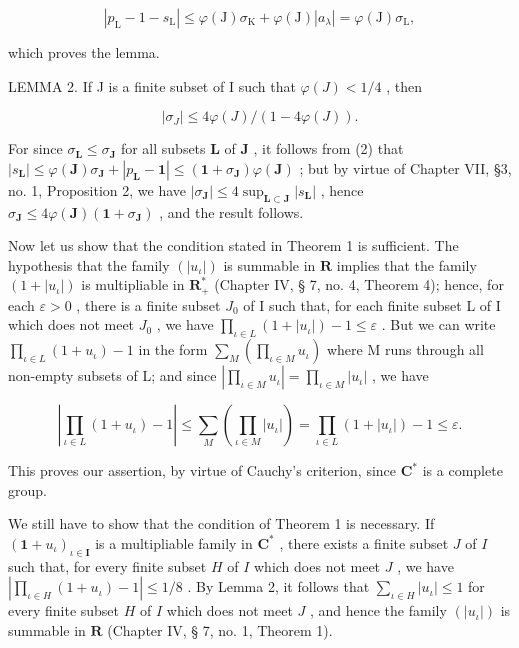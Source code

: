 \[
\left| p _ {\mathrm{L}} - \mathrm{1} - s _ {\mathrm{L}} \right| \leqslant \varphi (\mathrm{J}) \sigma_ {\mathrm{K}} + \varphi (\mathrm{J}) \left| a _ {\lambda} \right| = \varphi (\mathrm{J}) \sigma_ {\mathrm{L}},
\]

which proves the lemma.

LEMMA 2. If J is a finite subset of I such that \(\varphi(J) < 1/4\) , then

\[
\left| \sigma_ {J} \right| \leqslant 4 \varphi (J) / (1 - 4 \varphi (J)).
\]

For since \(\sigma_{\mathbf{L}} \leqslant \sigma_{\mathbf{J}}\) for all subsets \(\mathbf{L}\) of \(\mathbf{J}\) , it follows from (2) that \(|s_{\mathbf{L}}| \leqslant \varphi(\mathbf{J})\sigma_{\mathbf{J}} + |p_{\mathbf{L}} - \mathbf{1}| \leqslant (\mathbf{1} + \sigma_{\mathbf{J}})\varphi(\mathbf{J})\) ; but by virtue of Chapter VII, §3, no. 1, Proposition 2, we have \(|\sigma_{\mathbf{J}}| \leqslant 4\sup_{\mathbf{L} \subset \mathbf{J}} |s_{\mathbf{L}}|\) , hence \(\sigma_{\mathbf{J}} \leqslant 4\varphi(\mathbf{J})(\mathbf{1} + \sigma_{\mathbf{J}})\) , and the result follows.

Now let us show that the condition stated in Theorem 1 is sufficient. The hypothesis that the family \((|u_{\iota}|)\) is summable in \(\mathbf{R}\) implies that the family \((\mathrm{1} + |u_{\iota}|)\) is multipliable in \(\mathbf{R}_{+}^{*}\) (Chapter IV, § 7, no. 4, Theorem 4); hence, for each \(\varepsilon > 0\) , there is a finite subset \(J_{0}\) of I such that, for each finite subset L of I which does not meet \(J_{0}\) , we have \(\prod_{\iota \in L} (\mathrm{1} + |u_{\iota}|) - \mathrm{1} \leqslant \varepsilon\) . But we can write \(\prod_{\iota \in L} (\mathrm{1} + u_{\iota}) - \mathrm{1}\) in the form \(\sum_{M} \left( \prod_{\iota \in M} u_{\iota} \right)\) where M runs through all non-empty subsets of L; and since \(\left| \prod_{\iota \in M} u_{\iota} \right| = \prod_{\iota \in M} |u_{\iota}|\) , we have

\[
\left| \prod_ {\iota \in L} (1 + u _ {\iota}) - 1 \right| \leqslant \sum_ {M} \left(\prod_ {\iota \in M} | u _ {\iota} |\right) = \prod_ {\iota \in L} (1 + | u _ {\iota} |) - 1 \leqslant \varepsilon .
\]

This proves our assertion, by virtue of Cauchy's criterion, since \(\mathbf{C}^*\) is a complete group.

We still have to show that the condition of Theorem 1 is necessary. If \((\mathbf{1} + u_{\iota})_{\iota\in \mathbf{I}}\) is a multipliable family in \(\mathbf{C}^*\) , there exists a finite subset \(J\) of \(I\) such that, for every finite subset \(H\) of \(I\) which does not meet \(J\) , we have \(\left|\prod_{\iota\in H}(1 + u_{\iota}) - 1\right| \leqslant 1/8\) . By Lemma 2, it follows that \(\sum_{\iota\in H}|u_{\iota}| \leqslant 1\) for every finite subset \(H\) of \(I\) which does not meet \(J\) , and hence the family \((|u_{\iota}|)\) is summable in \(\mathbf{R}\) (Chapter IV, § 7, no. 1, Theorem 1).

